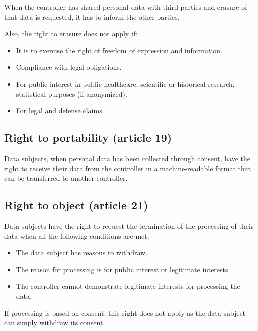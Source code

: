 \begin{remark}
    When the controller has shared personal data with third parties and erasure of that data is requested, it has to inform the other parties.
\end{remark}

Also, the right to erasure does not apply if:
\begin{itemize}
    \item It is to exercise the right of freedom of expression and information.
    \item Compliance with legal obligations.
    \item For public interest in public healthcare, scientific or historical research, statistical purposes (if anonymized).
    \item For legal and defense claims.
\end{itemize}


\subsection{Right to portability (article 19)} 

Data subjects, when personal data has been collected through consent, have the right to receive their data from the controller in a machine-readable format that can be transferred to another controller.


\subsection{Right to object (article 21)} 

Data subjects have the right to request the termination of the processing of their data when all the following conditions are met:
\begin{itemize}
    \item The data subject has reasons to withdraw.
    \item The reason for processing is for public interest or legitimate interests.
    \item The controller cannot demonstrate legitimate interests for processing the data.
\end{itemize}

\begin{remark}
    If processing is based on consent, this right does not apply as the data subject can simply withdraw its consent.
\end{remark}

